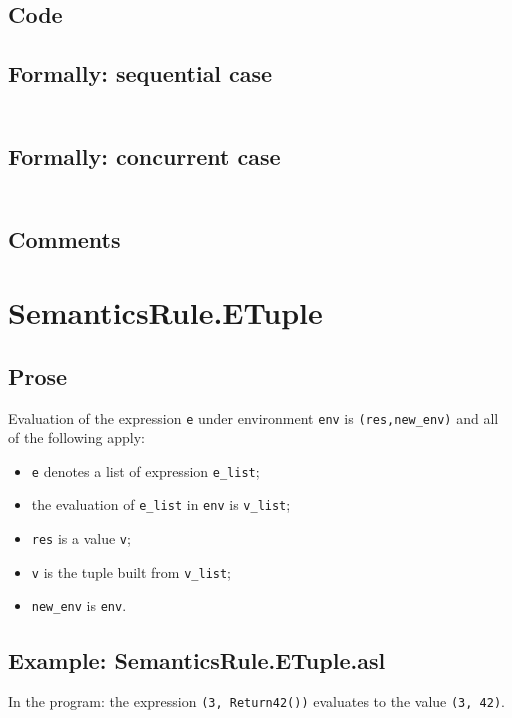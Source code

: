 \documentclass{book}
\begin{document}
  \subsection{Code}

  \subsection{Formally: sequential case}
  \begin{align}
  \end{align} 

  \subsection{Formally: concurrent case}
  \begin{align}
  \end{align} 

  \subsection{Comments}

\section{SemanticsRule.ETuple \label{sec:SemanticsRule.ETuple}}

  \subsection{Prose}
  Evaluation of the expression \texttt{e} under environment \texttt{env} is
  \texttt{(res,new\_env)} and all of the following apply:
  \begin{itemize}
  \item \texttt{e} denotes a list of expression \texttt{e\_list};
  \item the evaluation of \texttt{e\_list} in \texttt{env} is \texttt{v\_list};
  \item \texttt{res} is a value \texttt{v};
  \item \texttt{v} is the tuple built from \texttt{v\_list};
  \item \texttt{new\_env} is \texttt{env}.
  \end{itemize}

  \subsection{Example: SemanticsRule.ETuple.asl}
    In the program:
    the expression \texttt{(3, Return42())} evaluates to the value \texttt{(3, 42)}.
\end{document}
